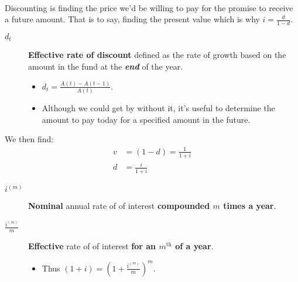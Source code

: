 \documentclass[10pt, french]{article}
\begin{document}
\begin{multicols*}{2}
\

Discounting is finding the price we'd be willing to pay for the promise to receive a future amount. That is to say, finding the present value which is why $i = \frac{d}{1 - d}$.
\begin{distributions}
\begin{description}
	\item[$d_{t}$]	\textbf{Effective rate of discount} defined as the rate of growth based on the amount in the fund at the \textbf{\textit{end}} of the year.
		\begin{itemize}
		\item	$d_{t} = \frac{A(t) - A(t - 1)}{A(t)}$.\
		\item	Although we could get by without it, it's useful to determine the amount to pay today for a specified amount in the future.
		\end{itemize}
\end{description}
\end{distributions}

We then find:
\begin{align*}
	v 
	&=	(1 - d) 
	=	\frac{1}{1 + i}	\\
	d 
	&=	\frac{i}{1 + i}
\end{align*}

\begin{distributions}
\begin{description}
	\item[$i^{(m)}$]	\textbf{Nominal} annual rate of of interest \textbf{compounded $m$ times a year}.
	\item[$\frac{i^{(m)}}{m}$]	\textbf{Effective} rate of of interest \textbf{for an $m^{\text{th}}$ of a year}.
		\begin{itemize}[leftmargin = *]
		\item	Thus $(1 + i) = \left(1 + \frac{i^{(m)}}{m}\right)^{m}$.\
		\end{itemize}
\end{description}
\end{distributions}

\


\end{multicols*}
\end{document}
